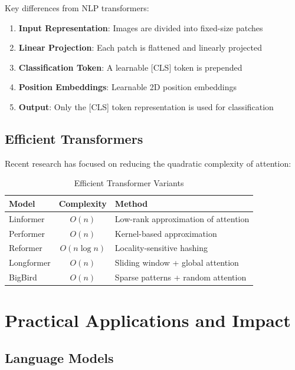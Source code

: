 \documentclass[11pt]{article}
\begin{document}
Key differences from NLP transformers:
\begin{enumerate}
    \item \textbf{Input Representation}: Images are divided into fixed-size patches
    \item \textbf{Linear Projection}: Each patch is flattened and linearly projected
    \item \textbf{Classification Token}: A learnable [CLS] token is prepended
    \item \textbf{Position Embeddings}: Learnable 2D position embeddings
    \item \textbf{Output}: Only the [CLS] token representation is used for classification
\end{enumerate}

\subsection{Efficient Transformers}

Recent research has focused on reducing the quadratic complexity of attention:

\begin{table}[H]
\centering
\caption{Efficient Transformer Variants}
\begin{tabular}{l c l}
\toprule
\textbf{Model} & \textbf{Complexity} & \textbf{Method} \\
\midrule
Linformer & $O(n)$ & Low-rank approximation of attention \\
Performer & $O(n)$ & Kernel-based approximation \\
Reformer & $O(n \log n)$ & Locality-sensitive hashing \\
Longformer & $O(n)$ & Sliding window + global attention \\
BigBird & $O(n)$ & Sparse patterns + random attention \\
\bottomrule
\end{tabular}
\end{table}

\section{Practical Applications and Impact}

\subsection{Language Models}
\end{document}
